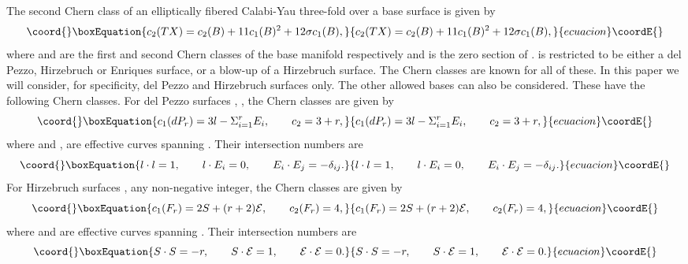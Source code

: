 \documentclass[a4paper,12pt]{article}
\numberwithin{equation}{section}
\theoremstyle{plain}
\begin{document}
The second Chern class of an elliptically fibered Calabi-Yau three-fold
\coordHE{} over a base surface \coordHE{} is given by
%
\begin{equation}\coord{}\boxEquation{
c_{2}(TX)= c_{2}(B)+11c_{1}(B)^{2}+12 \sigma c_{1}(B),
\label{eq:36}
}{
c_{2}(TX)= c_{2}(B)+11c_{1}(B)^{2}+12 \sigma c_{1}(B),
}{ecuacion}\coordE{}\end{equation}
%
where \coordHE{} and \coordHE{} are the first and second Chern classes of
the base manifold respectively and \myHighlight{$\sigma$}\coordHE{} is the zero section of \coordHE{}. 
\coordHE{} is restricted to be either a
del Pezzo, Hirzebruch or Enriques surface, or a blow-up of a Hirzebruch
surface. The Chern classes are known for all of these. In this paper
we will consider, for specificity, del Pezzo and Hirzebruch surfaces only. 
The other allowed bases can also be considered. These have the
following Chern classes. For del Pezzo surfaces \coordHE{}, \coordHE{}, the
Chern classes are given by
%
\begin{equation}\coord{}\boxEquation{
c_{1}(dP_{r})=3l-\Sigma_{i=1}^{r}E_{i}, \qquad c_{2}=3+r,
\label{eq:37}
}{
c_{1}(dP_{r})=3l-\Sigma_{i=1}^{r}E_{i}, \qquad c_{2}=3+r,
}{ecuacion}\coordE{}\end{equation}
%
where \coordHE{} and \coordHE{}, \coordHE{} are effective curves spanning
\coordHE{}. Their intersection numbers are
%
\begin{equation}\coord{}\boxEquation{
l \cdot l=1, \qquad l \cdot E_{i}=0, \qquad E_{i} \cdot E_{j}=-\delta_{ij}.
\label{eq:38}
}{
l \cdot l=1, \qquad l \cdot E_{i}=0, \qquad E_{i} \cdot E_{j}=-\delta_{ij}.
}{ecuacion}\coordE{}\end{equation}
%
For Hirzebruch surfaces \coordHE{}, \coordHE{} any non-negative integer, the Chern
classes are given by
%
\begin{equation}\coord{}\boxEquation{
c_{1}(F_{r})=2S+(r+2){\cal{E}}, \qquad c_{2}(F_{r}) =4,
\label{eq:39}
}{
c_{1}(F_{r})=2S+(r+2){\cal{E}}, \qquad c_{2}(F_{r}) =4,
}{ecuacion}\coordE{}\end{equation}
%
where \coordHE{} and \coordHE{} are effective curves spanning \coordHE{}. Their
intersection numbers are
%
\begin{equation}\coord{}\boxEquation{
S \cdot S=-r, \qquad S \cdot {\cal{E}}=1, \qquad {\cal{E}} \cdot {\cal{E}}=0.
\label{eq:40}
}{
S \cdot S=-r, \qquad S \cdot {\cal{E}}=1, \qquad {\cal{E}} \cdot {\cal{E}}=0.
}{ecuacion}\coordE{}\end{equation}
%
\end{document}
